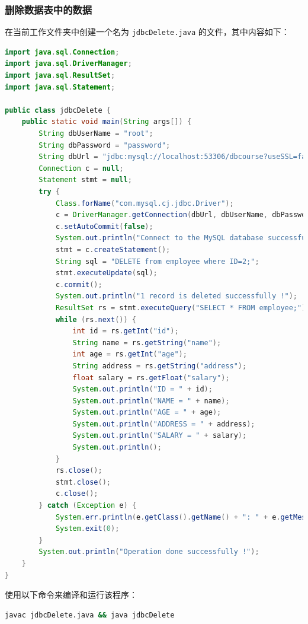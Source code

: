 \documentclass{article}
\renewcommand\tt{\texttt}
\begin{document}
\subsubsection{删除数据表中的数据}

在当前工作文件夹中创建一个名为 \tt{jdbcDelete.java} 的文件，其中内容如下：

\begin{lstlisting}[language=java]
import java.sql.Connection;
import java.sql.DriverManager;
import java.sql.ResultSet;
import java.sql.Statement;

public class jdbcDelete {
    public static void main(String args[]) {
        String dbUserName = "root";
        String dbPassword = "password";
        String dbUrl = "jdbc:mysql://localhost:53306/dbcourse?useSSL=false&allowPublicKeyRetrieval=true";
        Connection c = null;
        Statement stmt = null;
        try {
            Class.forName("com.mysql.cj.jdbc.Driver");
            c = DriverManager.getConnection(dbUrl, dbUserName, dbPassword);
            c.setAutoCommit(false);
            System.out.println("Connect to the MySQL database successfully!");
            stmt = c.createStatement();
            String sql = "DELETE from employee where ID=2;";
            stmt.executeUpdate(sql);
            c.commit();
            System.out.println("1 record is deleted successfully !");
            ResultSet rs = stmt.executeQuery("SELECT * FROM employee;");
            while (rs.next()) {
                int id = rs.getInt("id");
                String name = rs.getString("name");
                int age = rs.getInt("age");
                String address = rs.getString("address");
                float salary = rs.getFloat("salary");
                System.out.println("ID = " + id);
                System.out.println("NAME = " + name);
                System.out.println("AGE = " + age);
                System.out.println("ADDRESS = " + address);
                System.out.println("SALARY = " + salary);
                System.out.println();
            }
            rs.close();
            stmt.close();
            c.close();
        } catch (Exception e) {
            System.err.println(e.getClass().getName() + ": " + e.getMessage());
            System.exit(0);
        }
        System.out.println("Operation done successfully !");
    }
}
\end{lstlisting}

使用以下命令来编译和运行该程序：

\begin{lstlisting}[language=bash]
javac jdbcDelete.java && java jdbcDelete
\end{lstlisting}
\end{document}
